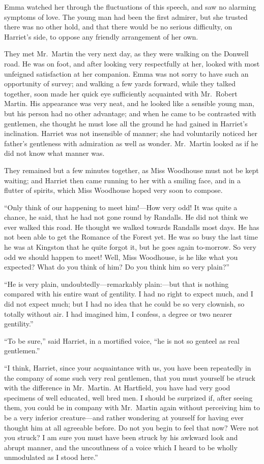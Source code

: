 Emma watched her through the fluctuations of this speech,
and saw no alarming symptoms of love.  The young man had been
the first admirer, but she trusted there was no other hold,
and that there would be no serious difficulty, on Harriet's side,
to oppose any friendly arrangement of her own.

They met Mr.\ Martin the very next day, as they were walking on the
Donwell road.  He was on foot, and after looking very respectfully
at her, looked with most unfeigned satisfaction at her companion.
Emma was not sorry to have such an opportunity of survey;
and walking a few yards forward, while they talked together, soon made
her quick eye sufficiently acquainted with Mr.\ Robert Martin.
His appearance was very neat, and he looked like a sensible young man,
but his person had no other advantage; and when he came to be
contrasted with gentlemen, she thought he must lose all the ground
he had gained in Harriet's inclination.  Harriet was not insensible
of manner; she had voluntarily noticed her father's gentleness
with admiration as well as wonder.  Mr.\ Martin looked as if he
did not know what manner was.

They remained but a few minutes together, as Miss Woodhouse must
not be kept waiting; and Harriet then came running to her with a
smiling face, and in a flutter of spirits, which Miss Woodhouse
hoped very soon to compose.

``Only think of our happening to meet him!---How very odd! It was
quite a chance, he said, that he had not gone round by Randalls.
He did not think we ever walked this road.  He thought we walked
towards Randalls most days.  He has not been able to get the
Romance of the Forest yet.  He was so busy the last time he was
at Kingston that he quite forgot it, but he goes again to-morrow.
So very odd we should happen to meet! Well, Miss Woodhouse, is he
like what you expected? What do you think of him? Do you think him
so very plain?''

``He is very plain, undoubtedly---remarkably plain:---but that is
nothing compared with his entire want of gentility.  I had no
right to expect much, and I did not expect much; but I had no
idea that he could be so very clownish, so totally without air.
I had imagined him, I confess, a degree or two nearer gentility.''

``To be sure,'' said Harriet, in a mortified voice, ``he is not
so genteel as real gentlemen.''

``I think, Harriet, since your acquaintance with us, you have been
repeatedly in the company of some such very real gentlemen,
that you must yourself be struck with the difference in Mr.\ Martin.
At Hartfield, you have had very good specimens of well educated,
well bred men.  I should be surprized if, after seeing them,
you could be in company with Mr.\ Martin again without perceiving
him to be a very inferior creature---and rather wondering at
yourself for having ever thought him at all agreeable before.
Do not you begin to feel that now? Were not you struck? I am sure
you must have been struck by his awkward look and abrupt manner,
and the uncouthness of a voice which I heard to be wholly unmodulated
as I stood here.''

